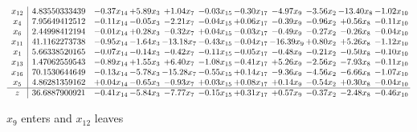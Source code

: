 \documentclass[9pt]{article}
\begin{document}
 \[\begin{array}{c| c c@{\hskip 2pt} c@{\hskip 2pt} c@{\hskip 2pt} c@{\hskip 2pt} c@{\hskip 2pt} c@{\hskip 2pt} c@{\hskip 2pt} c@{\hskip 2pt} c@{\hskip 2pt} }
 x_{12}   &  4.83550333439 & -0.37 x_{14} & +  5.89 x_{3} & +  1.04 x_{7} & -0.03 x_{15} & -0.30 x_{17} & -4.97 x_{9} & -3.56 x_{2} & -13.40 x_{8} & -1.02 x_{10}\\
 x_{4}   &  7.95649412512 & -0.11 x_{14} & -0.05 x_{3} & -2.21 x_{7} & -0.04 x_{15} & +  0.06 x_{17} & -0.39 x_{9} & -0.96 x_{2} & +  0.56 x_{8} & -0.11 x_{10}\\
 x_{6}   &  2.44998412194 & -0.01 x_{14} & +  0.28 x_{3} & -0.32 x_{7} & +  0.04 x_{15} & -0.03 x_{17} & -0.49 x_{9} & -0.27 x_{2} & -0.26 x_{8} & -0.04 x_{10}\\
 x_{11}   &  41.1162273738 & -0.95 x_{14} & -1.64 x_{3} & -13.18 x_{7} & -0.43 x_{15} & -0.04 x_{17} & -16.39 x_{9} & +  0.80 x_{2} & +  5.26 x_{8} & -1.12 x_{10}\\
 x_{1}   &  5.66338520165 & -0.07 x_{14} & -0.14 x_{3} & -0.42 x_{7} & -0.11 x_{15} & -0.05 x_{17} & -0.48 x_{9} & -0.21 x_{2} & -0.50 x_{8} & -0.10 x_{10}\\
 x_{13}   &  1.47062559543 & -0.89 x_{14} & +  1.55 x_{3} & +  6.40 x_{7} & -1.08 x_{15} & -0.41 x_{17} & +  5.26 x_{9} & -2.56 x_{2} & -7.93 x_{8} & -0.11 x_{10}\\
 x_{16}   &  70.1530644649 & -0.13 x_{14} & -5.78 x_{3} & -15.28 x_{7} & -0.55 x_{15} & +  0.14 x_{17} & -9.36 x_{9} & -4.56 x_{2} & -6.66 x_{8} & -1.07 x_{10}\\
 x_{5}   &  4.86281359162 & +  0.04 x_{14} & -0.65 x_{3} & -0.93 x_{7} & +  0.03 x_{15} & +  0.08 x_{17} & +  0.14 x_{9} & -0.54 x_{2} & +  0.30 x_{8} & -0.04 x_{10}\\
\hline
z    &  36.6887900921 & -0.41 x_{14} & -5.84 x_{3} & -7.77 x_{7} & -0.15 x_{15} & +  0.31 x_{17} & +  0.57 x_{9} & -0.37 x_{2} & -2.48 x_{8} & -0.46 x_{10}\\
\end{array}\]


 $ x_{9} $ enters and $ x_{12} $ leaves 
\end{document}
